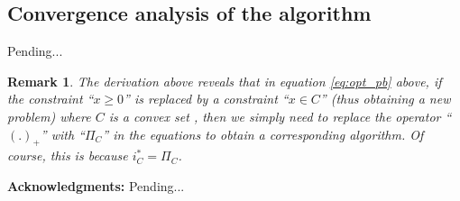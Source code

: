 \documentclass[a4paper,10pt,journal]{IEEEtran}
\newtheorem{remark}{Remark}
\begin{document}
\subsection{Convergence analysis of the algorithm}
Pending...

\begin{remark}
The derivation above reveals that in equation \eqref{eq:opt_pb} above, if the constraint ``$x \ge 0$'' is replaced by
a constraint ``$x \in C$'' (thus obtaining a new problem) where $C$ is a convex set
, then we simply need to replace the operator ``$(.)_+$''
with ``$\Pi_C$'' in the equations to obtain a corresponding algorithm. Of course, this is because $i_C^* = \Pi_C$.
\end{remark}

\medskip \noindent
\textbf{Acknowledgments:}
Pending...

 
\end{document}
